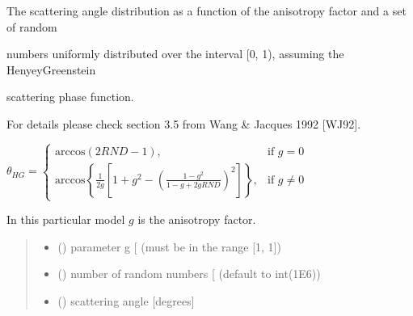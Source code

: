 \documentclass[letterpaper,10pt,english]{sphinxmanual}
\begin{document}

\begin{fulllineitems}
\label{\detokenize{06_anisotropy_factor:skinoptics.anisotropy_factor.theta_HG_from_RND}}
\pysigstartsignatures
{}
\pysigstopsignatures
\begin{DUlineblock}{0em}
\item[] The scattering angle distribution as a function of the anisotropy factor and a set of random
\item[] numbers uniformly distributed over the interval {[}0, 1), assuming the Henyey\sphinxhyphen{}Greenstein
\item[] scattering phase function.
\item[] For details please check section 3.5 from Wang \& Jacques 1992 {[}WJ92{]}.
\end{DUlineblock}

\sphinxAtStartPar
\(\theta_{HG} =  
\left \{ \begin{matrix}
\mbox{arccos}(2RND - 1) , & \mbox{if } g = 0 \\
\mbox{arccos}\left\{\frac{1}{2g} \left[1 + g^2 - \left(\frac{1 - g^2}{1 - g + 2gRND}\right)^2\right]\right\}, & \mbox{if } g \ne 0
\end{matrix} \right.\)

\sphinxAtStartPar
In this particular model \(g\) is the anisotropy factor.
\begin{quote}\begin{description}
\begin{itemize}
\item {} 
\sphinxAtStartPar
{} () \textendash{} parameter g {[}\sphinxhyphen{}{]} (must be in the range {[}\sphinxhyphen{}1, 1{]})

\item {} 
\sphinxAtStartPar
{} () \textendash{} number of random numbers {[}\sphinxhyphen{}{]} (default to int(1E6))

\end{itemize}

\sphinxAtStartPar
\begin{itemize}
\item {} 
\sphinxAtStartPar
{} () \textendash{} scattering angle {[}degrees{]}

\end{itemize}


\end{description}\end{quote}

\end{fulllineitems}
\end{document}
